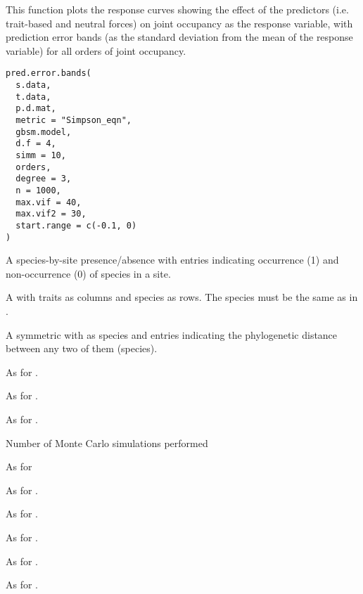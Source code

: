 \documentclass[a4paper]{book}
\begin{document}
%
\begin{Description}\relax
This function plots the response curves showing the effect of the predictors (i.e. trait-based and
neutral forces) on joint occupancy as the response variable, with prediction error bands (as the
standard deviation from the mean of the response variable) for all orders of joint occupancy.
\end{Description}
%
\begin{Usage}
\begin{verbatim}
pred.error.bands(
  s.data,
  t.data,
  p.d.mat,
  metric = "Simpson_eqn",
  gbsm.model,
  d.f = 4,
  simm = 10,
  orders,
  degree = 3,
  n = 1000,
  max.vif = 40,
  max.vif2 = 30,
  start.range = c(-0.1, 0)
)
\end{verbatim}
\end{Usage}
%
\begin{Arguments}
\begin{ldescription}
\item[\code{s.data}] A species-by-site presence/absence  with entries indicating
occurrence (1) and non-occurrence (0) of species in a site.

\item[\code{t.data}] A  with traits as columns and species as rows. The species must be the same as
in .

\item[\code{p.d.mat}] A symmetric  with  as species and entries indicating the
phylogenetic distance between any two of them (species).

\item[\code{metric}] As for .

\item[\code{gbsm.model}] As for .

\item[\code{d.f}] As for .

\item[\code{simm}] Number of Monte Carlo simulations performed

\item[\code{orders}] As for 

\item[\code{degree}] As for .

\item[\code{n}] As for .

\item[\code{max.vif}] As for .

\item[\code{max.vif2}] As for .

\item[\code{start.range}] As for .
\end{ldescription}
\end{Arguments}
\end{document}
